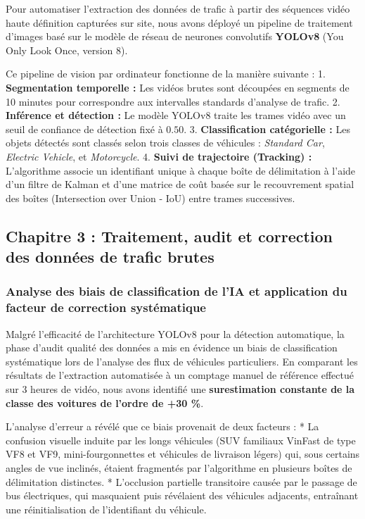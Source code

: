 \documentclass[10pt, a4paper]{article}
\begin{document}
Pour automatiser l'extraction des données de trafic à partir des
séquences vidéo haute définition capturées sur site, nous avons déployé
un pipeline de traitement d'images basé sur le modèle de réseau de
neurones convolutifs \textbf{YOLOv8} (You Only Look Once, version 8).

Ce pipeline de vision par ordinateur fonctionne de la manière suivante :
1. \textbf{Segmentation temporelle :} Les vidéos brutes sont découpées
en segments de 10 minutes pour correspondre aux intervalles standards
d'analyse de trafic. 2. \textbf{Inférence et détection :} Le modèle
YOLOv8 traite les trames vidéo avec un seuil de confiance de détection
fixé à \(0.50\). 3. \textbf{Classification catégorielle :} Les objets
détectés sont classés selon trois classes de véhicules : \emph{Standard
Car}, \emph{Electric Vehicle}, et \emph{Motorcycle}. 4. \textbf{Suivi de
trajectoire (Tracking) :} L'algorithme associe un identifiant unique à
chaque boîte de délimitation à l'aide d'un filtre de Kalman et d'une
matrice de coût basée sur le recouvrement spatial des boîtes
(Intersection over Union - IoU) entre trames successives.

\newpage

\subsection{Chapitre 3 : Traitement, audit et correction des données de
trafic
brutes}\label{chapitre-3-traitement-audit-et-correction-des-donnuxe9es-de-trafic-brutes}

\subsubsection{Analyse des biais de classification de l'IA et
application du facteur de correction
systématique}\label{analyse-des-biais-de-classification-de-lia-et-application-du-facteur-de-correction-systuxe9matique}

Malgré l'efficacité de l'architecture YOLOv8 pour la détection
automatique, la phase d'audit qualité des données a mis en évidence un
biais de classification systématique lors de l'analyse des flux de
véhicules particuliers. En comparant les résultats de l'extraction
automatisée à un comptage manuel de référence effectué sur 3 heures de
vidéo, nous avons identifié une \textbf{surestimation constante de la
classe des voitures de l'ordre de +30 \%}.

L'analyse d'erreur a révélé que ce biais provenait de deux facteurs : *
La confusion visuelle induite par les longs véhicules (SUV familiaux
VinFast de type VF8 et VF9, mini-fourgonnettes et véhicules de livraison
légers) qui, sous certains angles de vue inclinés, étaient fragmentés
par l'algorithme en plusieurs boîtes de délimitation distinctes. *
L'occlusion partielle transitoire causée par le passage de bus
électriques, qui masquaient puis révélaient des véhicules adjacents,
entraînant une réinitialisation de l'identifiant du véhicule.
\end{document}

